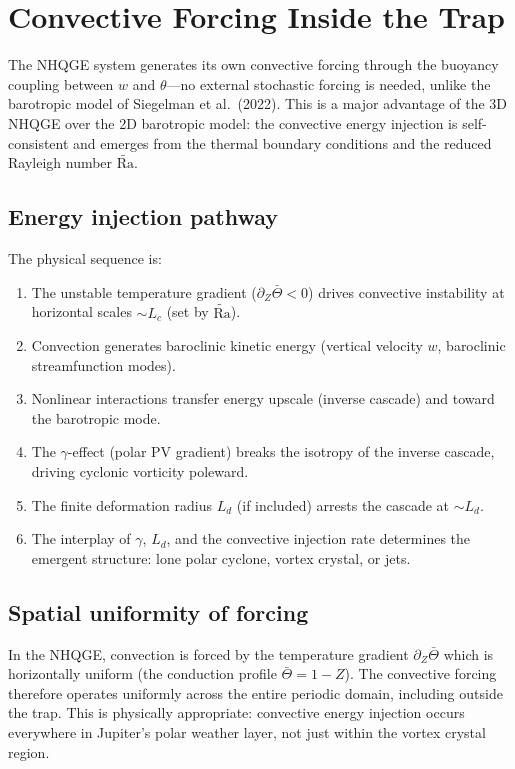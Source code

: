 \documentclass[11pt]{article}
\newcommand{\Rav}{\widetilde{\mathrm{Ra}}}
\newcommand{\Ld}{L_d}
\newcommand{\Lc}{L_c}
\begin{document}
\section{Convective Forcing Inside the Trap}
\label{sec:forcing}

The NHQGE system generates its own convective forcing through the buoyancy coupling between $w$ and $\theta$---no external stochastic forcing is needed, unlike the barotropic model of Siegelman et al.\ (2022). This is a major advantage of the 3D NHQGE over the 2D barotropic model: the convective energy injection is self-consistent and emerges from the thermal boundary conditions and the reduced Rayleigh number $\Rav$.

\subsection{Energy injection pathway}

The physical sequence is:
\begin{enumerate}[nosep]
\item The unstable temperature gradient ($\partial_Z\bar\Theta < 0$) drives convective instability at horizontal scales $\sim \Lc$ (set by $\Rav$).
\item Convection generates baroclinic kinetic energy (vertical velocity $w$, baroclinic streamfunction modes).
\item Nonlinear interactions transfer energy upscale (inverse cascade) and toward the barotropic mode.
\item The $\gamma$-effect (polar PV gradient) breaks the isotropy of the inverse cascade, driving cyclonic vorticity poleward.
\item The finite deformation radius $\Ld$ (if included) arrests the cascade at $\sim\Ld$.
\item The interplay of $\gamma$, $\Ld$, and the convective injection rate determines the emergent structure: lone polar cyclone, vortex crystal, or jets.
\end{enumerate}

\subsection{Spatial uniformity of forcing}

In the NHQGE, convection is forced by the temperature gradient $\partial_Z\bar\Theta$ which is horizontally uniform (the conduction profile $\bar\Theta = 1 - Z$). The convective forcing therefore operates uniformly across the entire periodic domain, including outside the trap. This is physically appropriate: convective energy injection occurs everywhere in Jupiter's polar weather layer, not just within the vortex crystal region.
\end{document}
